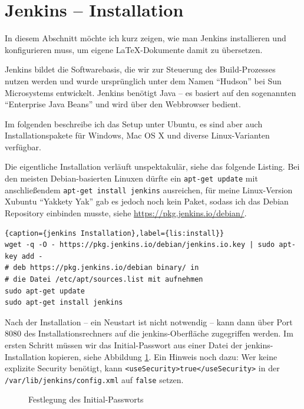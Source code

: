 \section{Jenkins -- Installation}

In diesem Abschnitt möchte ich kurz zeigen, wie man Jenkins installieren und konfigurieren muss, um eigene \LaTeX-Dokumente damit zu übersetzen.

Jenkins bildet die Softwarebasis, die wir zur Steuerung des Build-Prozesses nutzen werden und wurde ursprünglich unter dem Namen \enquote{Hudson} bei Sun Microsystems entwickelt. Jenkins benötigt Java -- es basiert auf den sogenannten \enquote{Enterprise Java Beans} und wird über den Webbrowser bedient. 

Im folgenden beschreibe ich das Setup unter Ubuntu, es sind aber auch Installationspakete für Windows, Mac OS X und diverse Linux-Varianten verfügbar.

Die eigentliche Installation verläuft unspektakulär, siehe das folgende Listing. Bei den meisten Debian-basierten Linuxen dürfte ein \lstinline{apt-get update} mit anschließendem \lstinline{apt-get install jenkins} ausreichen, für meine Linux-Version Xubuntu \enquote{Yakkety Yak} gab es jedoch noch kein Paket, sodass ich das Debian Repository einbinden musste, siehe \url{https://pkg.jenkins.io/debian/}.

\begin{lstlisting}{caption={jenkins Installation},label={lis:install}}
wget -q -O - https://pkg.jenkins.io/debian/jenkins.io.key | sudo apt-key add -
# deb https://pkg.jenkins.io/debian binary/ in 
# die Datei /etc/apt/sources.list mit aufnehmen
sudo apt-get update
sudo apt-get install jenkins
\end{lstlisting}

Nach der Installation -- ein Neustart ist nicht notwendig -- kann dann über Port 8080 des Installationsrechners auf die jenkins-Oberfläche zugegriffen werden. Im ersten Schritt müssen wir das Initial-Passwort aus einer Datei der jenkins-Installation kopieren, siehe Abbildung \ref{fig:initial}. Ein Hinweis noch dazu: Wer keine explizite Security benötigt, kann \lstinline{<useSecurity>true</useSecurity>} in der \texttt{/var/lib/jenkins/config.xml} auf \texttt{false} setzen.

\begin{figure}
\caption{Festlegung des Initial-Passworts}\label{fig:initial}
\end{figure}

